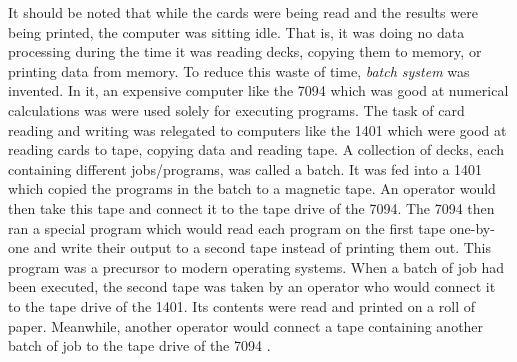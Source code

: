 It should be noted that while the cards were being read and the results were being printed, the computer was sitting idle. That is, it was doing no data processing during the time it was reading decks, copying them to memory, or printing data from memory. To reduce this waste of time, \textit{batch system} was invented. In it, an expensive computer like the 7094 which was good at numerical calculations was were used solely for executing programs. The task of card reading and writing was relegated to computers like the 1401 which were good at reading cards to tape, copying data and reading tape. A collection of decks, each containing different jobs/programs, was called a batch. It was fed into a 1401 which copied the programs in the batch to a magnetic tape. An operator would then take this tape and connect it to the tape drive of the 7094. The 7094 then ran a special program which would read each program on the first tape one-by-one and write their output to a second tape instead of printing them out. This program was a precursor to modern operating systems. When a batch of job had been executed, the second tape was taken by an operator who would connect it to the tape drive of the 1401. Its contents were read and printed on a roll of paper. Meanwhile, another operator would connect a tape containing another batch of job to the tape drive of the 7094 \cite{tannenbaum2003operating}.

